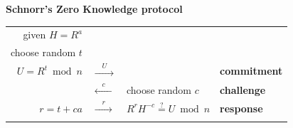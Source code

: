 \begin{frame}
\begin{center}
  \vspace{1em}
  \textbf{Schnorr's Zero Knowledge protocol}\\
    \vspace{0.5em}
    \begin{tabular}{rll@{\hskip 0.6cm}l}
      given $H=R^{a}$ &&&\\
      choose random $t$ &&&\\
      $U = R^t \bmod n$ & $\xrightarrow{\quad U\quad}$&&\textbf{commitment}\\
      &$\xleftarrow{\quad c\quad}$ & choose random $c$ &\textbf{challenge} \\
      $r = t + ca$ & $\xrightarrow{\quad r\quad}$ & $R^rH^{-c} \stackrel{?}{=} U  \bmod n$ &\textbf{response}\\
      \vspace{0.2em}\\
    \end{tabular}
  \end{center}
  \note{
  }
\end{frame}

